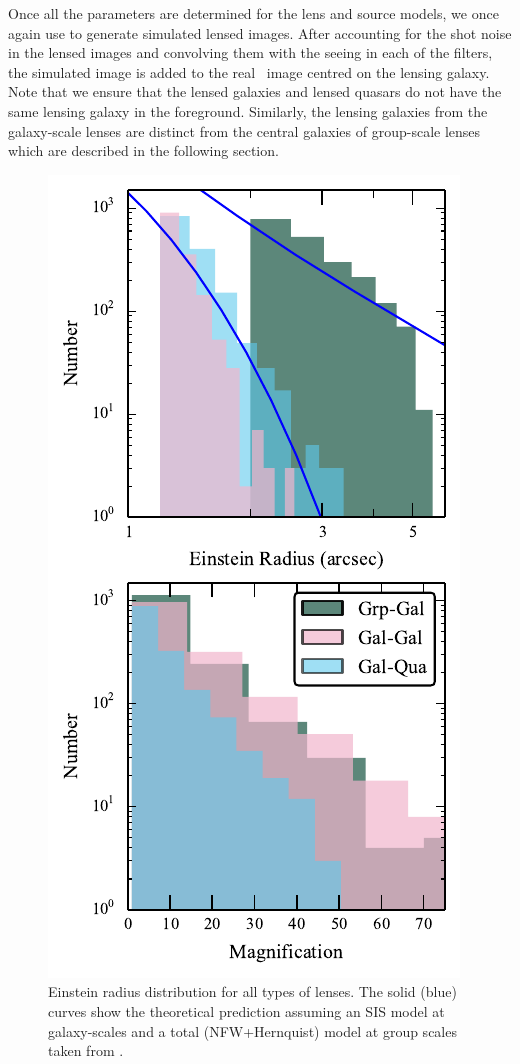 \documentclass[useAMS,usenatbib,a4paper]{mn2e}
\begin{document}
Once all the parameters are determined for the lens and source models, we once
again use \gravlens to generate simulated lensed images.  After accounting for the shot
noise in the lensed images and convolving them with the seeing in each of
the filters, the simulated image is added to the real \cfhtls~image centred
on the lensing galaxy. Note that we ensure that the lensed galaxies and
lensed quasars do not have the same lensing galaxy in the foreground. Similarly,
the lensing galaxies from the galaxy-scale lenses are distinct from the central
galaxies of group-scale lenses which are described in the following section.


\begin{figure}
\begin{center}
\includegraphics[scale=1.2]{distrib_remu.pdf}
\caption{ \label{fig:remudist}
Einstein radius distribution for all types of lenses. The solid (blue)
curves show the theoretical prediction assuming an SIS model at galaxy-scales
and a total (NFW+Hernquist) model at group scales taken from \citep{More2012}.
}
\end{center}
\end{figure}
\end{document}
